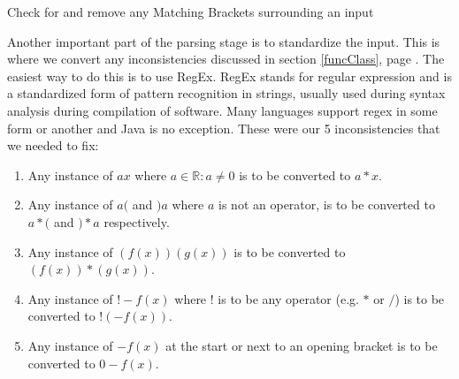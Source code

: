 \documentclass{article}
\begin{document}
\begin{algorithm}[H]
\DontPrintSemicolon
\caption{Check for and remove any Matching Brackets surrounding an input}
\end{algorithm}
\newpage
Another important part of the parsing stage is to standardize the input. This is where we convert any inconsistencies discussed in section \ref{funcClass}, page \pageref{funcClass}. The easiest way to do this is to use RegEx. RegEx stands for regular expression and is a standardized form of pattern recognition in strings, usually used during syntax analysis during compilation of software. Many languages support regex in some form or another and Java is no exception. These were our 5 inconsistencies that we needed to fix:
\begin{enumerate}
	\item Any instance of $ax$ where $a \in  \mathbb{R} : a \neq 0$ is to be converted to $a*x$.
	\item Any instance of $a($ and $)a$ where $a$ is not an operator, is to be converted to $a*($ and $)*a$ respectively.
	\item Any instance of $(f(x))(g(x))$ is to be converted to $(f(x))*(g(x))$.
	\item Any instance of $!-f(x)$ where $!$ is to be any operator (e.g. $*$ or $/$) is to be converted to $! (-f(x))$.
	\item Any instance of $-f(x)$ at the start or next to an opening bracket is to be converted to $0 - f(x)$.
\end{enumerate}
\end{document}
